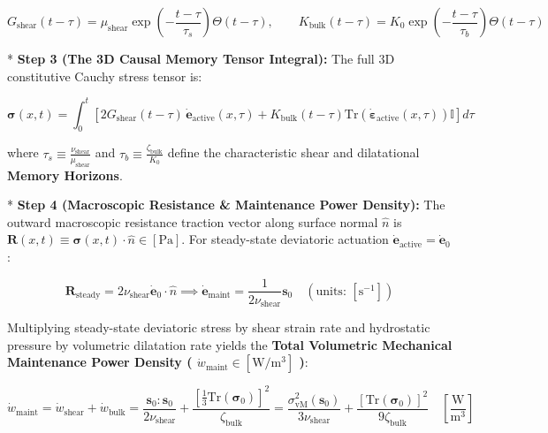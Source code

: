 \documentclass[11pt,a4paper]{article}
\theoremstyle{definition}
\theoremstyle{remark}
\begin{document}
\begin{equation}
G_{\text{shear}}(t - \tau) = \mu_{\text{shear}} \exp\left( -\frac{t - \tau}{\tau_s} \right) \Theta(t - \tau), \qquad K_{\text{bulk}}(t - \tau) = K_0 \exp\left( -\frac{t - \tau}{\tau_b} \right) \Theta(t - \tau)
\end{equation}


* \textbf{Step 3 (The 3D Causal Memory Tensor Integral):}
The full 3D constitutive Cauchy stress tensor is:


\begin{equation}
\boxed{\boldsymbol{\sigma}(x, t) = \int_0^t [ 2 G_{\text{shear}}(t - \tau) \, \dot{\mathbf{e}}_{\text{active}}(x, \tau) + K_{\text{bulk}}(t - \tau) \mathrm{Tr}(\dot{\boldsymbol{\varepsilon}}_{\text{active}}(x, \tau)) \mathbb{I} ] d\tau}
\end{equation}


where $\tau_s \equiv \frac{\nu_{\text{shear}}}{\mu_{\text{shear}}}$ and $\tau_b \equiv \frac{\zeta_{\text{bulk}}}{K_0}$ define the characteristic shear and dilatational \textbf{Memory Horizons}.

* \textbf{Step 4 (Macroscopic Resistance \& Maintenance Power Density):}
The outward macroscopic resistance traction vector along surface normal $\hat{n}$ is $\mathbf{R}(x, t) \equiv \boldsymbol{\sigma}(x, t) \cdot \hat{n} \in [\mathrm{Pa}]$. For steady-state deviatoric actuation $\dot{\mathbf{e}}_{\text{active}} = \dot{\mathbf{e}}_0$:


\begin{equation}
\mathbf{R}_{\text{steady}} = 2 \nu_{\text{shear}} \dot{\mathbf{e}}_0 \cdot \hat{n} \implies \dot{\mathbf{e}}_{\text{maint}} = \frac{1}{2\nu_{\text{shear}}} \mathbf{s}_0 \quad \left( \text{units: } [\mathrm{s}^{-1}] \right)
\end{equation}


Multiplying steady-state deviatoric stress by shear strain rate and hydrostatic pressure by volumetric dilatation rate yields the \textbf{Total Volumetric Mechanical Maintenance Power Density ( $\dot{w}_{\text{maint}} \in [\mathrm{W/m^3}]$ )}:


\begin{equation}
\boxed{\dot{w}_{\text{maint}} = \dot{w}_{\text{shear}} + \dot{w}_{\text{bulk}} = \frac{\mathbf{s}_0 : \mathbf{s}_0}{2\nu_{\text{shear}}} + \frac{[\frac{1}{3}\mathrm{Tr}(\boldsymbol{\sigma}_0)]^2}{\zeta_{\text{bulk}}} = \frac{\sigma_{\mathrm{vM}}^2\left(\mathbf{s}_0\right)}{3 \nu_{\text{shear}}} + \frac{[ \mathrm{Tr} \left(\boldsymbol{\sigma}_0\right) ]^2}{9 \zeta_{\text{bulk}}} \quad [\frac{\mathrm{W}}{\mathrm{m^3}}]}
\end{equation}
\end{document}
